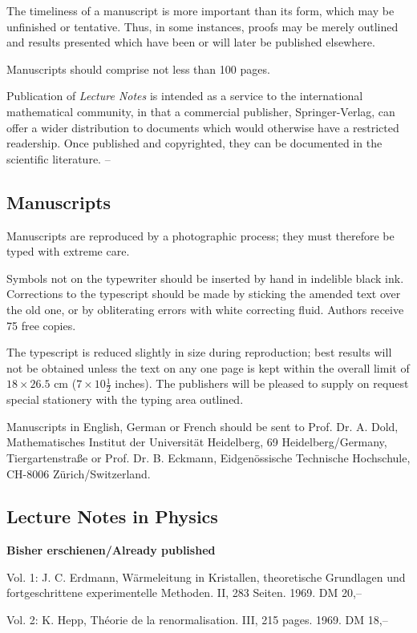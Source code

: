 The timeliness of a manuscript is more important than its form, which may be unfinished or tentative.
Thus, in some instances, proofs may be merely outlined and results presented which have been or will
later be published elsewhere.

Manuscripts should comprise not less than 100 pages.

Publication of \textit{Lecture Notes} is intended as a service to the international mathematical community, in
that a commercial publisher, Springer-Verlag, can offer a wider distribution to documents which would
otherwise have a restricted readership. Once published and copyrighted, they can be documented in the
scientific literature. --

\subsection*{Manuscripts}
Manuscripts are reproduced by a photographic process; they must therefore be typed with extreme care.

Symbols not on the typewriter should be inserted by hand in indelible black ink.
Corrections to the typescript should be made by sticking the amended text over
the old one, or by obliterating errors with white correcting fluid. Authors
receive 75 free copies.

The typescript is reduced slightly in size during reproduction; best results
will not be obtained unless the text on any one page is kept within the overall
limit of $18\times26.5$ cm ($7\times10\frac12$ inches). The publishers will be
pleased to supply on request special stationery with the typing area outlined.

Manuscripts in English, German or French should be sent to Prof. Dr. A. Dold,
Mathematisches Institut der Universität Heidelberg, 69 Heidelberg/Germany,
Tiergartenstraße or Prof. Dr. B. Eckmann, Eidgenössische Technische Hochschule,
CH-8006 Zürich/Switzerland.

\subsection*{Lecture Notes in Physics}
\textbf{Bisher erschienen/Already published}

Vol. 1: J. C. Erdmann, Wärmeleitung in Kristallen, theoretische Grundlagen und
fortgeschrittene experimentelle Methoden. II, 283 Seiten. 1969. DM 20,--

Vol. 2: K. Hepp, Théorie de la renormalisation. III, 215 pages. 1969. DM 18,--


